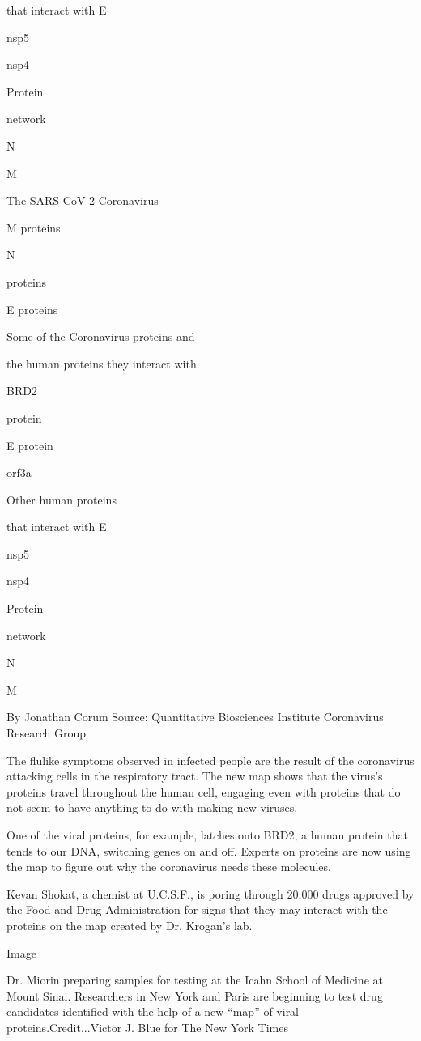 that interact with E

nsp5

nsp4

Protein

network

N

M

The SARS-CoV-2 Coronavirus

M proteins

N

proteins

E proteins

Some of the Coronavirus proteins and

the human proteins they interact with

BRD2

protein

E protein

orf3a

Other human proteins

that interact with E

nsp5

nsp4

Protein

network

N

M

By Jonathan Corum \textbar{} Source: Quantitative Biosciences Institute
Coronavirus Research Group

The flulike symptoms observed in infected people are the result of the
coronavirus attacking cells in the respiratory tract. The new map shows
that the virus's proteins travel throughout the human cell, engaging
even with proteins that do not seem to have anything to do with making
new viruses.

One of the viral proteins, for example, latches onto BRD2, a human
protein that tends to our DNA, switching genes on and off. Experts on
proteins are now using the map to figure out why the coronavirus needs
these molecules.

Kevan Shokat, a chemist at U.C.S.F., is poring through 20,000 drugs
approved by the Food and Drug Administration for signs that they may
interact with the proteins on the map created by Dr. Krogan's lab.

Image

Dr. Miorin preparing samples for testing at the Icahn School of Medicine
at Mount Sinai. Researchers in New York and Paris are beginning to test
drug candidates identified with the help of a new ``map'' of viral
proteins.Credit...Victor J. Blue for The New York Times

